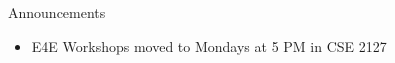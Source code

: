 \begin{frame}{Announcements}
    \begin{itemize}
        \item E4E Workshops moved to Mondays at 5 PM in CSE 2127
    \end{itemize}
\end{frame}
